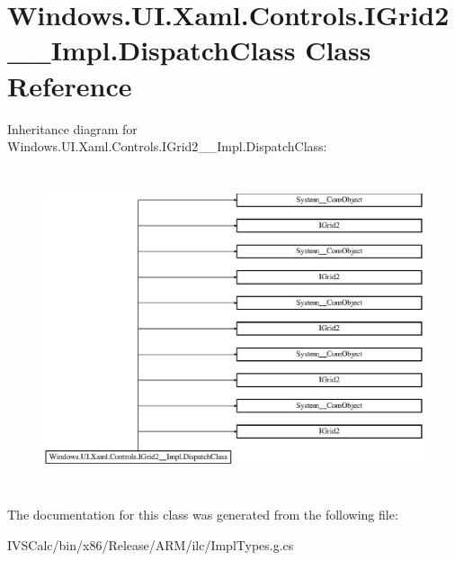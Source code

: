 \hypertarget{class_windows_1_1_u_i_1_1_xaml_1_1_controls_1_1_i_grid2_____impl_1_1_dispatch_class}{}\section{Windows.\+U\+I.\+Xaml.\+Controls.\+I\+Grid2\+\_\+\+\_\+\+Impl.\+Dispatch\+Class Class Reference}
\label{class_windows_1_1_u_i_1_1_xaml_1_1_controls_1_1_i_grid2_____impl_1_1_dispatch_class}
Inheritance diagram for Windows.\+U\+I.\+Xaml.\+Controls.\+I\+Grid2\+\_\+\+\_\+\+Impl.\+Dispatch\+Class\+:\begin{figure}[H]
\begin{center}
\leavevmode
\includegraphics[height=9.447853cm]{class_windows_1_1_u_i_1_1_xaml_1_1_controls_1_1_i_grid2_____impl_1_1_dispatch_class}
\end{center}
\end{figure}


The documentation for this class was generated from the following file\+:\begin{DoxyCompactItemize}
\item 
I\+V\+S\+Calc/bin/x86/\+Release/\+A\+R\+M/ilc/Impl\+Types.\+g.\+cs\end{DoxyCompactItemize}
